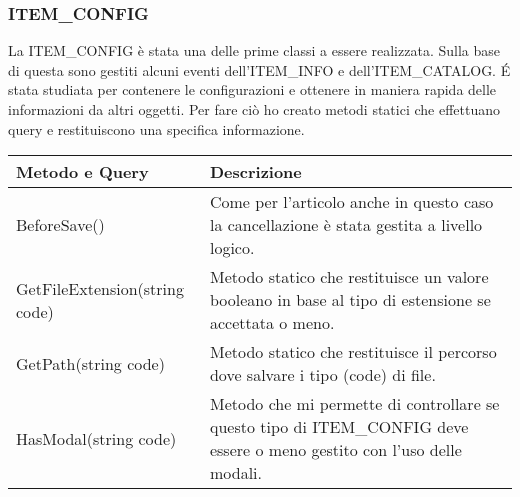 \subsubsection{ITEM\_CONFIG}
La ITEM\_CONFIG è stata una delle prime classi a essere realizzata. Sulla base di questa sono gestiti alcuni eventi dell'ITEM\_INFO e dell'ITEM\_CATALOG. \'E stata studiata per contenere le configurazioni e ottenere in maniera rapida delle informazioni da altri oggetti. Per fare ciò ho creato metodi statici che effettuano query e restituiscono una specifica informazione.
\begin{center}
	\begin{tabular}{ p{4cm}|p{} }
		\hline
		\textbf{Metodo e Query} & \textbf{Descrizione}\\
		\hline
		BeforeSave()		& Come per l'articolo anche in questo caso la cancellazione è stata gestita a livello logico.\\
		\hline
		GetFileExtension(string code)	& Metodo statico che restituisce un valore booleano in base al tipo di estensione se accettata o meno.\\
		\hline
		GetPath(string code) & Metodo statico che restituisce il percorso dove salvare i tipo (code) di file.\\
		\hline
		HasModal(string code) & Metodo che mi permette di controllare se questo tipo di ITEM\_CONFIG deve essere o meno gestito con l'uso delle modali.\\

	\end{tabular}
\end{center}

